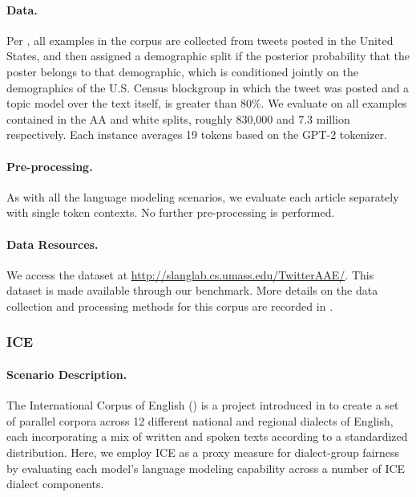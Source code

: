 \paragraph{Data.}
Per \citet{blodgett2016}, all examples in the corpus are collected from tweets posted in the United States, and then assigned a demographic split if the posterior probability that the poster belongs to that demographic, which is conditioned jointly on the demographics of the U.S. Census blockgroup in which the tweet was posted and a topic model over the text itself, is greater than 80\%. We evaluate on all examples contained in the AA and white splits, roughly 830,000 and 7.3 million respectively. Each instance averages 19 tokens based on the GPT-2 tokenizer.

\paragraph{Pre-processing.}
As with all the language modeling scenarios, we evaluate each article separately with single token contexts. No further pre-processing is performed.

\paragraph{Data Resources.}
We access the dataset at \url{http://slanglab.cs.umass.edu/TwitterAAE/}. This dataset is made available through our benchmark. More details on the data collection and processing methods for this corpus are recorded in \citet{blodgett2016}.

\subsubsection{ICE}

\paragraph{Scenario Description.}
The International Corpus of English (\ice) is a project introduced in \citet{Greenbaum1991-js} to create a set of parallel corpora across 12 different national and regional dialects of English, each incorporating a mix of written and spoken texts according to a standardized distribution. Here, we employ ICE as a proxy measure for dialect-group fairness by evaluating each model's language modeling capability across a number of ICE dialect components. 

